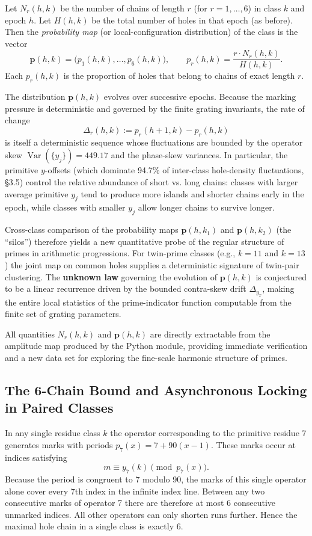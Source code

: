 \documentclass[11pt,a4paper]{article}
\begin{document}
Let \(N_r(h,k)\) be the number of chains of length \(r\) (for \(r=1,\dots,6\)) in class \(k\) and epoch \(h\). Let \(H(h,k)\) be the total number of holes in that epoch (as before). Then the \emph{probability map} (or local-configuration distribution) of the class is the vector
\[
\mathbf{p}(h,k) = \bigl(p_1(h,k),\dots,p_6(h,k)\bigr),\qquad p_r(h,k) = \frac{r\cdot N_r(h,k)}{H(h,k)}.
\]
Each \(p_r(h,k)\) is the proportion of holes that belong to chains of exact length \(r\).

The distribution \(\mathbf{p}(h,k)\) evolves over successive epochs. Because the marking pressure is deterministic and governed by the finite grating invariants, the rate of change
\[
\Delta_r(h,k) := p_r(h+1,k) - p_r(h,k)
\]
is itself a deterministic sequence whose fluctuations are bounded by the operator skew \(\operatorname{Var}(\{y_j\})=449.17\) and the phase-skew variances. In particular, the primitive \(y\)-offsets (which dominate 94.7\% of inter-class hole-density fluctuations, §3.5) control the relative abundance of short vs. long chains: classes with larger average primitive \(y_j\) tend to produce more islands and shorter chains early in the epoch, while classes with smaller \(y_j\) allow longer chains to survive longer.

Cross-class comparison of the probability maps \(\mathbf{p}(h,k_1)\) and \(\mathbf{p}(h,k_2)\) (the “silos”) therefore yields a new quantitative probe of the regular structure of primes in arithmetic progressions. For twin-prime classes (e.g., \(k=11\) and \(k=13\)) the joint map on common holes supplies a deterministic signature of twin-pair clustering. The \textbf{unknown law} governing the evolution of \(\mathbf{p}(h,k)\) is conjectured to be a linear recurrence driven by the bounded contra-skew drift \(\Delta_{y_x}\), making the entire local statistics of the prime-indicator function computable from the finite set of grating parameters.

All quantities \(N_r(h,k)\) and \(\mathbf{p}(h,k)\) are directly extractable from the amplitude map produced by the Python module, providing immediate verification and a new data set for exploring the fine-scale harmonic structure of primes.

\subsection{The 6-Chain Bound and Asynchronous Locking in Paired Classes}

In any single residue class \(k\) the operator corresponding to the primitive residue 7 generates marks with periods \(p_7(x)=7+90(x-1)\). These marks occur at indices satisfying
\[
m \equiv y_7(k) \pmod{p_7(x)}.
\]
Because the period is congruent to 7 modulo 90, the marks of this single operator alone cover every 7th index in the infinite index line. Between any two consecutive marks of operator 7 there are therefore at most 6 consecutive unmarked indices. All other operators can only shorten runs further. Hence the maximal hole chain in a single class is exactly 6.
\end{document}
